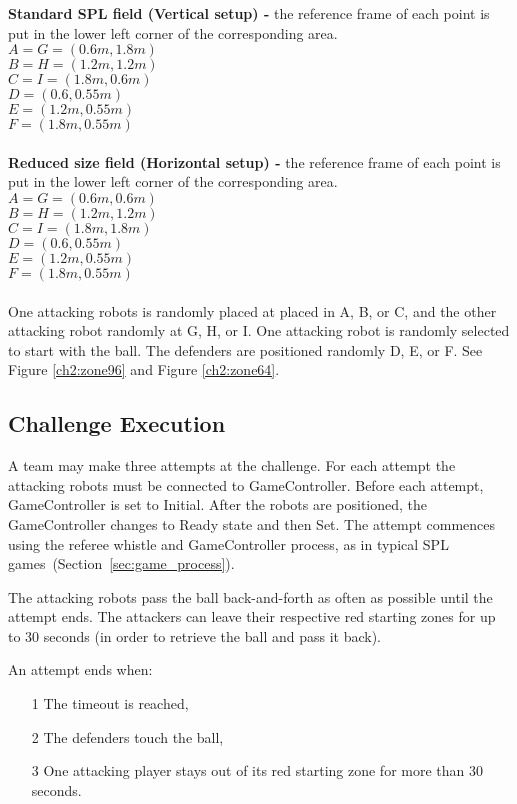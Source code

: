 \textbf{Standard SPL field (Vertical setup) -} the reference frame of each point is put in the lower left corner of the corresponding area.
\\
$A = G = (0.6m, 1.8m)$
\\
$B = H = (1.2m, 1.2m)$
\\
$C = I = (1.8m, 0.6m)$
\\
$D = (0.6, 0.55m)$
\\
$E = (1.2m, 0.55m)$
\\
$F = (1.8m, 0.55m)$
\\
\\
\textbf{Reduced size field (Horizontal setup) -} the reference frame of each point is put in the lower left corner of the corresponding area.
\\
$A = G = (0.6m, 0.6m)$
\\
$B = H = (1.2m, 1.2m)$
\\
$C = I = (1.8m, 1.8m)$
\\
$D = (0.6, 0.55m)$
\\
$E = (1.2m, 0.55m)$
\\
$F = (1.8m, 0.55m)$
\\
\\
One attacking robots is randomly placed at placed in A, B, or C, and the other attacking robot randomly at G, H, or I.  One attacking robot is randomly selected to start with the ball. The defenders are positioned randomly D, E, or F.
See Figure \ref{ch2:zone96} and Figure \ref{ch2:zone64}.

\subsection{Challenge Execution}
A team may make three attempts at the challenge. For each attempt the attacking robots must be connected to GameController.
Before each attempt, GameController is set to Initial. After the robots are positioned, the GameController changes to Ready state and then Set. The attempt commences using the referee whistle and GameController process, as in typical SPL games~(\cf Section~\ref{sec:game_process}). 

The attacking robots pass the ball back-and-forth as often as possible until the attempt ends. The attackers can leave their respective red starting zones for up to 30 seconds (in order to retrieve the ball and pass it back).
    
An attempt ends when: 
\begin{itemize}
    \item[1] The timeout is reached,
    \item[2] The defenders touch the ball,
    \item[3] One attacking player stays out of its red starting zone for more than 30 seconds.
\end{itemize}

